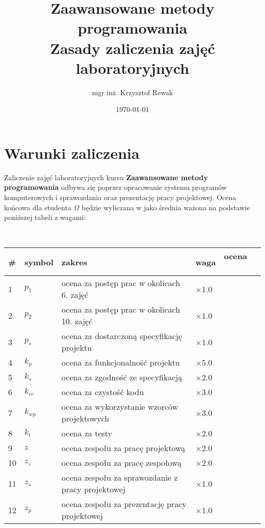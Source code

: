 \documentclass{article}
\title{
	Zaawansowane metody programowania\\
	\Huge{Zasady zaliczenia zajęć laboratoryjnych}
}
\author{mgr inż. Krzysztof Rewak}
\date{\today}
\begin{document}
	\maketitle

	\section{Warunki zaliczenia}
	Zaliczenie zajęć laboratoryjnych kursu \textbf{Zaawansowane metody programowania} odbywa się poprzez opracowanie systemu programów komputerowych i sprawozdania oraz prezentację pracy projektowej. Ocena końcowa dla studenta $\Omega$ będzie wyliczana w jako średnia ważona na podstawie poniższej tabeli z wagami:
	
	\ \\
	
	\begin{tabularx}{.95\textwidth}{l|l|X|l|l}
		\textbf{\#} & \textbf{symbol} & \textbf{zakres} & \textbf{waga} & \textbf{ ocena \ \ \ } \\ \hline
		1 & $p_1$ & ocena za postęp prac w okolicach 6. zajęć & $\times$1.0 \\ \hline
		2 & $p_2$ & ocena za postęp prac w okolicach 10. zajęć & $\times$1.0 \\ \hline
		3 & $p_s$ & ocena za dostarczoną specyfikację projektu & $\times$1.0 \\ \hline
		4 & $k_{p}$ & ocena za funkcjonalność projektu & $\times$5.0 \\ \hline
		5 & $k_{s}$ & ocena za zgodność ze specyfikacją & $\times$2.0 \\ \hline
		6 & $k_{cc}$ & ocena za czystość kodu & $\times$3.0 \\ \hline
		7 & $k_{wp}$ & ocena za wykorzystanie wzorców projektowych & $\times$3.0 \\ \hline
		8 & $k_{t}$ & ocena za testy & $\times$2.0 \\ \hline
		9 & $z$ & ocena zespołu za pracę projektową & $\times$2.0 \\ \hline
		10 & $z_z$ & ocena zespołu za pracę zespołową & $\times$2.0 \\ \hline
		11 & $z_s$ & ocena zespołu za sprawozdanie z pracy projektowej & $\times$1.0 \\ \hline
		12 & $z_p$ & ocena zespołu za prezentację pracy projektowej & $\times$1.0 \\
	\end{tabularx}
	
	\ \\
	
\end{document}
